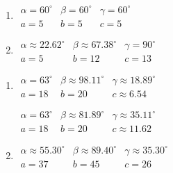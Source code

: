 \documentclass{ximera}
\begin{document}
\begin{multicols}{2} 

\begin{enumerate}

\setcounter{enumi}{\value{HW}}

\item $\begin{array}{lll}
\alpha = 60^{\circ} & \beta = 60^{\circ} & \gamma = 60^{\circ} \\
a = 5 & b = 5 & c = 5 \end{array}$

\item $\begin{array}{lll}
\alpha \approx 22.62^{\circ} & \beta \approx 67.38^{\circ} & \gamma = 90^{\circ} \\
a = 5 & b = 12 & c = 13 \end{array}$

\setcounter{HW}{\value{enumi}}

\end{enumerate}

\end{multicols}

\begin{multicols}{2}

\begin{enumerate}

\setcounter{enumi}{\value{HW}}

\item $\begin{array}{lll}
\alpha = 63^{\circ} & \beta \approx 98.11^{\circ} & \gamma \approx 18.89^{\circ} \\
a = 18 & b = 20 & c \approx 6.54 \end{array}$

$\begin{array}{lll}
\alpha = 63^{\circ} & \beta \approx 81.89^{\circ} & \gamma \approx 35.11^{\circ} \\
a = 18 & b = 20 & c \approx 11.62 \end{array}$

\item $\begin{array}{lll}
\alpha \approx 55.30^{\circ} & \beta \approx 89.40^{\circ} & \gamma \approx 35.30^{\circ} \\
a = 37 & b = 45 & c = 26 \end{array}$

\setcounter{HW}{\value{enumi}}

\end{enumerate}

\end{multicols}
\end{document}
